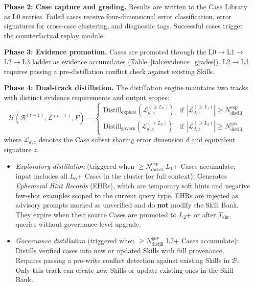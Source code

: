 \textbf{Phase 2: Case capture and grading.} Results are written to the Case Library as L0 entries. Failed cases receive four-dimensional error classification, error signatures for cross-case clustering, and diagnostic tags. Successful cases trigger the counterfactual replay module.

\textbf{Phase 3: Evidence promotion.} Cases are promoted through the L0$\to$L1$\to$L2$\to$L3 ladder as evidence accumulates (Table~\ref{tab:evidence_grades}). L2$\to$L3 requires passing a pre-distillation conflict check against existing Skills.

\textbf{Phase 4: Dual-track distillation.}
The distillation engine maintains two tracks with distinct evidence requirements and output scopes:
\begin{equation}
  \mathcal{U}(\mathcal{B}^{(t-1)}, \mathcal{L}^{(t-1)}, F) = \begin{cases}
    \text{Distill}_{\text{explore}}(\mathcal{L}_{d,z}^{(\geq L_0)}) & \text{if } |\mathcal{L}_{d,z}^{(\geq L_1)}| \geq N_{\text{distill}}^{\text{exp}} \\
    \text{Distill}_{\text{govern}}(\mathcal{L}_{d,z}^{(\geq L_2)}) & \text{if } |\mathcal{L}_{d,z}^{(\geq L_2)}| \geq N_{\text{distill}}^{\text{gov}}
  \end{cases}
  \label{eq:dual_track}
\end{equation}
where $\mathcal{L}_{d,z}$ denotes the Case subset sharing error dimension $d$ and equivalent signature $z$.

\begin{itemize}
  \item \emph{Exploratory distillation} (triggered when $\geq N_{\text{distill}}^{\text{exp}}$ $L_1$+ Cases accumulate; input includes all $L_0$+ Cases in the cluster for full context): Generates \emph{Ephemeral Hint Records} (EHRs), which are temporary soft hints and negative few-shot examples scoped to the current query type. EHRs are injected as advisory prompts marked as unverified and do \textbf{not} modify the Skill Bank. They expire when their source Cases are promoted to $L_2$+ or after $T_{\text{ehr}}$ queries without governance-level upgrade.
  \item \emph{Governance distillation} (triggered when $\geq N_{\text{distill}}^{\text{gov}}$ L2+ Cases accumulate): Distills verified cases into new or updated Skills with full provenance. Requires passing a pre-write conflict detection against existing Skills in $\mathcal{B}$. Only this track can create new Skills or update existing ones in the Skill Bank.
\end{itemize}


